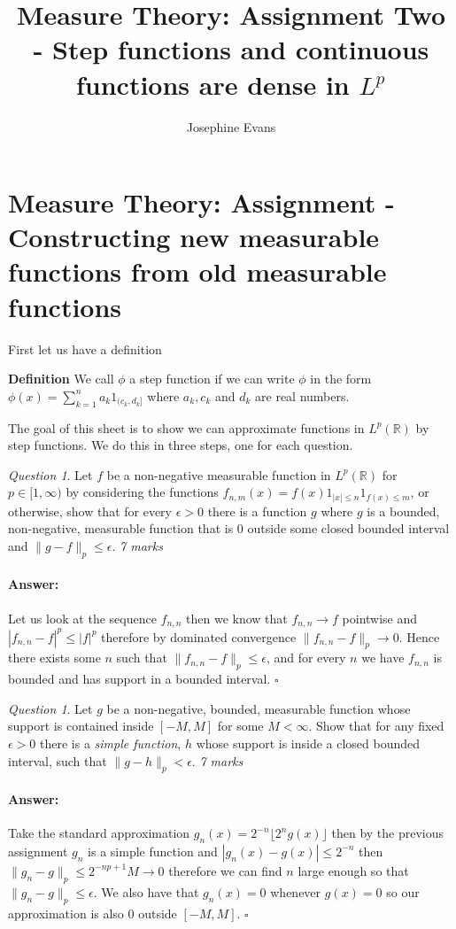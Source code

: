 \documentclass[11pt]{article}
\author{
Josephine Evans
}
\title{Measure Theory: Assignment Two - Step functions and continuous functions are dense in $L^p$}
\theoremstyle{definition}
\theoremstyle{remark}
\newtheorem{q}[thm]{Question}
\newenvironment{ans}{\paragraph{Answer:}}{\hfill$\square$ \vspace{20pt}}
\begin{document}
\section{Measure Theory: Assignment  - Constructing new measurable functions from old measurable functions}
First let us have a definition

\textbf{Definition}
We call $\phi$ a step function if we can write $\phi$ in the form $\phi(x) = \sum_{k=1}^n a_k 1_{(c_k,d_k]}$ where $a_k,c_k$ and $d_k$ are real numbers. 

The goal of this sheet is to show we can approximate functions in $L^p(\mathbb{R})$ by step functions. We do this in three steps, one for each question.
\begin{q}
Let $f$ be a non-negative measurable function in $L^p(\mathbb{R})$ for $p \in [1,\infty)$ by considering the functions $f_{n,m}(x) = f(x)1_{|x| \leq n}1_{f(x) \leq m}$, or otherwise, show that for every $\epsilon >0$ there is a function $g$ where $g$ is a bounded, non-negative, measurable function that is 0 outside some closed bounded interval and $\|g-f\|_p \leq \epsilon$. \emph{7 marks}
\end{q}
\begin{ans}
Let us look at the sequence $f_{n,n}$ then we know that $f_{n,n} \rightarrow f$ pointwise and $|f_{n,n}-f|^p \leq |f|^p$ therefore by dominated convergence $\|f_{n,n} -f \|_p \rightarrow 0$. Hence there exists some $n$ such that $\|f_{n,n}-f\|_p \leq \epsilon$, and for every $n$ we have $f_{n,n}$ is bounded and has support in a bounded interval.
\end{ans}

\begin{q}
Let $g$ be a non-negative, bounded, measurable function whose support is contained inside $[-M,M]$ for some $M<\infty$. Show that for any fixed $\epsilon >0$ there is a \emph{simple function}, $h$ whose support is inside a closed bounded interval, such that $\|g-h\|_p < \epsilon$. \emph{7 marks}
\end{q}
\begin{ans}
Take the standard approximation $g_n(x) = 2^{-n}\lfloor 2^n g(x) \rfloor$ then by the previous assignment $g_n$ is a simple function and $|g_n(x) - g(x)| \leq 2^{-n}$ then $\|g_n -g\|_p \leq 2^{-np+1}M \rightarrow 0$ therefore we can find $n$ large enough so that $\|g_n -g\|_p \leq \epsilon$. We also have that $g_n(x) = 0$ whenever $g(x) = 0$ so our approximation is also 0 outside $[-M, M]$.  
\end{ans}
\end{document}
